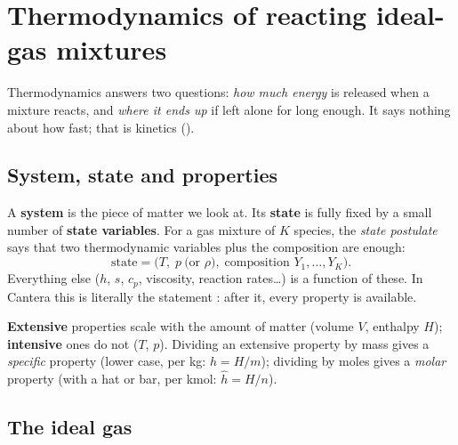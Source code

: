 \chapter{Thermodynamics of reacting ideal-gas mixtures}
\label{ch:thermo}

Thermodynamics answers two questions: \emph{how much energy} is released when a mixture reacts,
and \emph{where it ends up} if left alone for long enough. It says nothing about how fast; that is
kinetics ().

\section{System, state and properties}

A \textbf{system} is the piece of matter we look at. Its \textbf{state} is fully fixed by a small
number of \textbf{state variables}. For a gas mixture of $K$ species, the \emph{state postulate} says
that two thermodynamic variables plus the composition are enough:
\begin{equation}
  \text{state} = \big(T,\;p\ \text{(or }\rho),\;\text{composition }Y_1,\dots,Y_K\big).
\end{equation}
Everything else ($h$, $s$, $c_p$, viscosity, reaction rates\dots) is a function of these. In
Cantera this is literally the statement : after it, every property is
available.

\textbf{Extensive} properties scale with the amount of matter (volume $V$, enthalpy $H$);
\textbf{intensive} ones do not ($T$, $p$). Dividing an extensive property by mass gives a
\emph{specific} property (lower case, per kg: $h=H/m$); dividing by moles gives a \emph{molar}
property (with a hat or bar, per kmol: $\hat h = H/n$).

\section{The ideal gas}
\label{sec:idealgas}

